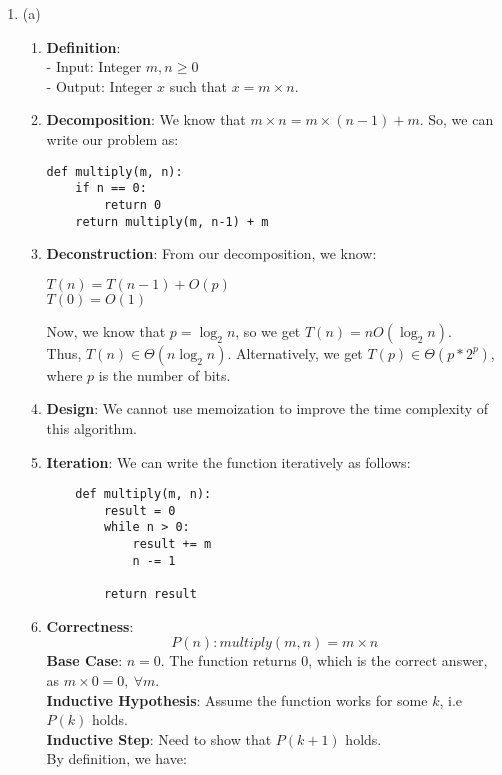 \documentclass[a4paper]{article}
\begin{document}
\begin{enumerate}
    \item (a)
    \begin{enumerate}[label=\roman*]
        \item \textbf{Definition}:\\
- Input: Integer $m, n \geq 0$\\
- Output: Integer $x$ such that $x = m \times n$.
\item \textbf{Decomposition}: We know that $m \times n = m \times (n-1) + m$. So, we can write our problem as:\\
\begin{verbatim}
def multiply(m, n):
    if n == 0:
        return 0
    return multiply(m, n-1) + m
\end{verbatim}
\item \textbf{Deconstruction}: From our decomposition, we know:
\begin{center}
    $T(n) = T(n-1) + O(p)$\\
$T(0) = O(1)$
\end{center}
Now, we know that $p = \log_2 n$, so we get $T(n) = nO(\log_2 n)$.\\
Thus, $T(n) \in \Theta (n \log_2 n)$. Alternatively, we get $T(p) \in \Theta(p * 2^p)$, where $p$ is the number of bits.
\item \textbf{Design}: We cannot use memoization to improve the time complexity of this algorithm.
\item \textbf{Iteration}: We can write the function iteratively as follows:
\begin{verbatim}
    def multiply(m, n):
        result = 0
        while n > 0:
            result += m
            n -= 1

        return result
\end{verbatim}
\item \textbf{Correctness}:
$$P(n): multiply(m, n) = m\times n$$
\textbf{Base Case}: $n = 0$. The function returns 0, which is the correct answer, as $m\times 0 = 0,\ \forall m$. \\
\textbf{Inductive Hypothesis}: Assume the function works for some $k$, i.e $P(k)$ holds.\\
\textbf{Inductive Step}: Need to show that $P(k+1)$ holds.\\
By definition, we have:
\begin{center}
    

\end{center}
\end{enumerate}
\end{enumerate}
\end{document}
